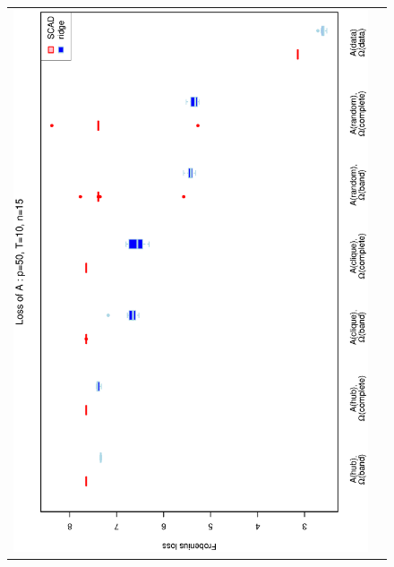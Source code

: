 \documentclass[a4paper]{article}
\begin{document}
\begin{figure}[h!]
\centering
\begin{tabular}{cc}
\includegraphics[scale=0.45,angle=270]{LossA50T10N15_25.eps}
\\

\end{tabular}
\end{figure}
\end{document}
